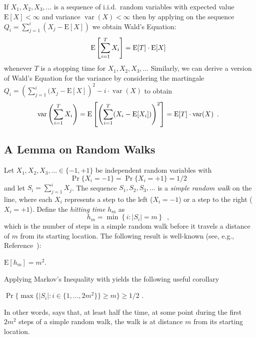 \documentclass[lotsofwhite]{patmorin}
\newcommand{\E}{\mathrm{E}}
\DeclareMathOperator{\var}{var}
\begin{document}
If $X_1,X_2,X_3,\ldots$ is a sequence of i.i.d.\ random variables with
expected value $\E[X]<\infty$ and variance $\var(X)<\infty$ then by applying
 on the sequence $Q_i=\sum_{j=1}^i(X_j-\E[X])$ we
obtain Wald's Equation:
\begin{equation}
    \E\left[\sum_{i=1}^T X_i \right] = \E[T]\cdot\E[X] \eqlabel{wald-1}
\end{equation}
whenever $T$ is a stopping time for $X_1,X_2,X_3,\ldots$  Similarly,
we can derive a version of Wald's Equation for the variance by considering 
the martingale 
$Q_i=\left(\sum_{j=1}^i (X_j-\E[X]\right)^2 - i\cdot\var(X)$ 
to obtain
\begin{equation}
    \var\left(\sum_{i=1}^T X_i\right) = \E\left[\left(\sum_{i=1}^T (X_i-\E[X_i])\right)^2 \right] =
\E[T]\cdot\var(X) \enspace . \eqlabel{wald-2}
\end{equation}


\subsection{A Lemma on Random Walks}

Let $X_1,X_2,X_3,\ldots\in\{-1,+1\}$ be independent random variables with
\[ \Pr\{X_i=-1\}=\Pr\{X_i=+1\}=1/2
\]
and let $S_i=\sum_{j=1}^i X_j$.  The sequence $S_1,S_2,S_3,\ldots$ is
a \emph{simple random walk} on the line, where each $X_i$ represents a
step to the left ($X_i=-1$) or a step to the right ($X_i=+1$).
Define the \emph{hitting time} $h_m$ as
\[
   h_m = \min\left\{i:|S_i|= m\right\} \enspace ,
\]
which is the number of steps in a simple random walk
before it travels a distance of $m$ from its starting location.
The following result is well-known (see, e.g.,
Reference~\cite{mu05}):
\begin{lem}
$\E[h_m] = m^2$.
\end{lem}
Applying Markov's Inequality with  yields the
following useful corollary
\begin{cor}
$\Pr\{\max\{|S_i|:i\in\{1,\ldots,2m^2\}\} \ge m\} \ge 1/2$ .
\end{cor}
In other words,  says that, at least half the
time, at some point
during the first $2m^2$ steps of a simple random walk, the 
walk is at distance $m$ from its starting
location.
\end{document}
